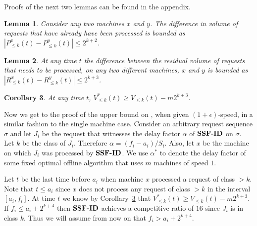 \documentclass[11pt]{article}
\newtheorem{lemma}{Lemma}[section]
\newtheorem{corollary}[lemma]{Corollary}
\newcommand{\corref}[1]{Corollary~\ref{cor:#1}}
\newcommand{\lemlab}[1]{\label{lemma:#1}}
\newcommand{\corlab}[1]{\label{cor:#1}}
\newcommand{\eps}{\epsilon}
\begin{document}
Proofs of the next two lemmas can be found in the appendix.


\begin{lemma}
  \lemlab{processbound} Consider any two machines $x$ and $y$.  The
  difference in volume of requests that have already have been
  processed is bounded as $|P^{x}_{\leq k} (t) - P^{y}_{\leq k} (t)|
  \leq 2^{k+2}$.
\end{lemma}

\begin{lemma}
  \lemlab{closebound} At any time $t$ the difference between the
  residual volume of requests that needs to be processed, on any two
  different machines, $x$ and $y$ is bounded as $|R^{x}_{\leq k} (t) -
  R^{y}_{\leq k}(t)| \leq 2^{k+3}$.
\end{lemma}


\begin{corollary}
  \corlab{optarrival} At any time $t$, $V^*_{\leq k} (t) \geq V_{\leq
    k} (t) - m2^{k+3}$.
\end{corollary}




Now we get to the proof of the upper bound on \mmug, when given $(1+
\eps)$-speed, in a similar fashion to the single machine
case. Consider an arbitrary request sequence $\sigma$ and let $J_i$ be
the request that witnesses the delay factor $\alpha$ of ${\texttt{\bf{SSF-ID}}}$ on $\sigma$.
Let $k$ be the class of $J_i$. Therefore $\alpha = (f_i - a_i)/S_i$.
Also, let $x$ be the machine on which $J_i$ was processed by ${\texttt{\bf{SSF-ID}}}$.
We use $\alpha^*$ to denote the delay factor of some fixed optimal
offline algorithm that uses $m$ machines of speed $1$.

Let $t$ be the last time before $a_i$ when machine $x$ processed a request
of class $> k$. Note that $t \leq a_i$ since $x$ does not process any
request of class $> k$ in the interval $[a_i,f_i]$. At time $t$ we
know by \corref{optarrival} that $V^*_{\leq k} (t) \geq
V_{\leq k} (t) - m2^{k+3}$. If $f_i \le a_i + 2^{k+4}$ then ${\texttt{\bf{SSF-ID}}}$
achieves a competitive ratio of $16$ since $J_i$ is in class
$k$. Thus we will assume from now on that $f_i > a_i + 2^{k+4}$.
\end{document}
